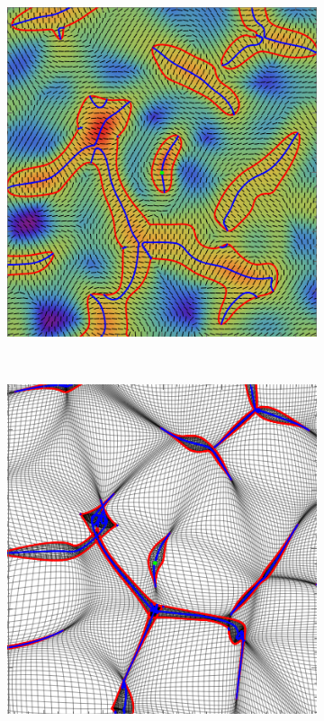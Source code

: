 \documentclass[a4paper, 11pt]{article}
\begin{document}
\begin{figure}
\centering
\begin{subfigure}[b]{0.28\textwidth}
\includegraphics[width=\textwidth]{Cusp_L}
\end{subfigure}~
\begin{subfigure}[b]{0.28\textwidth}
\includegraphics[width=\textwidth]{Cusp_Z}

\end{subfigure}
\end{figure}
\end{document}
